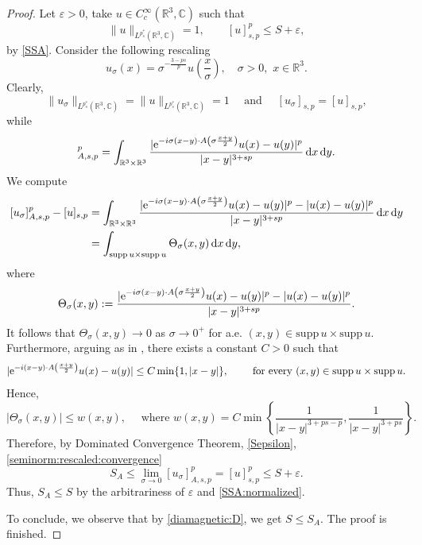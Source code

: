\documentclass[leqno,11pt]{amsart}
\newcommand{\R}{\mathbb R}
\newcommand{\CC}{\mathbb C}
\newcommand{\C}{\mathbb C}
\newcommand{\eps}{\varepsilon}
\newcommand{\supp}{\mathrm{supp}\,}
\numberwithin{equation}{section}
\def\e{{\rm e}}
\newcommand{\expAminus}{\e^{-i(x-y)\cdot A\left(\frac{x+y}{2}\right)}}
\begin{document}
\begin{proof}
Let $\eps > 0$, take $u \in C^\infty_c(\R^3,\C)$ such that 
\begin{equation}\label{Sepsilon}
       \|u\|_{L^{p^*_s}(\R^3,\CC)}=1, \qquad [u]_{s,p}^p \leq S + \eps,
\end{equation}
by \eqref{SSA}.
Consider the following rescaling
\begin{equation}
    u_\sigma(x)=\sigma^{-\frac{3-ps}{p}}u\left(\frac{x}{\sigma}\right), \quad \sigma>0, \,\,x \in \R^3.
\end{equation}
Clearly,
\begin{equation}
    \|u_\sigma\|_{L^{p^*_s}(\R^3,\CC)}=\|u\|_{L^{p^*_s}(\R^3,\CC)}=1 \quad \text{ and } \quad [u_\sigma]_{s,p}=[u]_{s,p},
\end{equation}
while
\begin{equation}
    [u_\sigma]_{A,s,p}^p = \int_{\R^3\times \R^3} \frac{|\e^{-i\sigma(x-y)\cdot A\left(\sigma\frac{x+y}{2}\right)}u(x)-u(y)|^p}{|x-y|^{3+sp}} \dd x\dd y.
\end{equation}
We compute
\begin{equation}
\label{seminorm:rescaled:convergence}
    \begin{aligned}
        [u_\sigma]_{A,s,p}^p - [u]_{s,p} 
        &=\int_{\R^3\times \R^3} \frac{|\e^{-i\sigma(x-y)\cdot A\left(\sigma\frac{x+y}{2}\right)}u(x)-u(y)|^p- |u(x)-u(y)|^p}{|x-y|^{3+sp}} \dd x\dd y\\
        &=\int_{\supp u\times \supp u}\Theta_\sigma(x,y) \dd x \dd y,
    \end{aligned}
\end{equation}
where
$$\Theta_\sigma(x,y):=\frac{|\e^{-i\sigma(x-y)\cdot A\left(\sigma\frac{x+y}{2}\right)}u(x)-u(y)|^p- |u(x)-u(y)|^p}{|x-y|^{3+sp}}.$$
It follows that $\Theta_\sigma(x,y) \to 0$ as $\sigma \to 0^+$ for a.e. $(x,y)\in \supp u\times\supp u$. Furthermore, arguing as in \cite[Proposition 2.2]{dAveniaSquassina}, there exists a constant $C>0$ such that 
    \begin{equation}
        |\expAminus u(x) - u(y)| \leq C\min\{1,|x-y|\},\qquad \text{ for every } (x, y)\in \supp u\times\supp u.
    \end{equation}
Hence,
\begin{equation}
\label{theta:est}
    |\Theta_\sigma(x,y)| \leq w(x,y), \quad \text{ where } w(x,y) = C\min\left\{\frac{1}{|x-y|^{3+ps-p}},\frac{1}{|x-y|^{3+ps}} \right\}.
\end{equation}
Therefore, by Dominated Convergence Theorem, \eqref{Sepsilon}, \eqref{seminorm:rescaled:convergence}
$$S_A\le \lim_{\sigma\to0}[u_\sigma]_{A,s,p}^p = [u]_{s,p}^p\le S + \eps.$$
Thus, $S_A\le S$ by the arbitrariness of $\eps$ and \eqref{SSA:normalized}.

To conclude, we observe that by \eqref{diamagnetic:D}, we get $S \leq S_A$. The proof is finished.
\end{proof}
\end{document}
